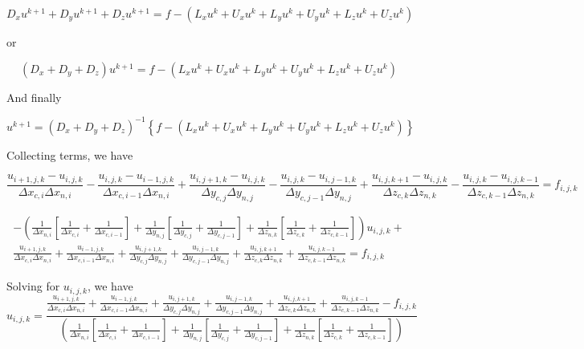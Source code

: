 \documentclass[11pt]{article}
\begin{document}
\begin{equation}
	D_x u^{k+1} +
	D_y u^{k+1} +
	D_z u^{k+1}
	 = f - (
	L_x u^{k} + U_x u^{k} +
	L_y u^{k} + U_y u^{k} +
	L_z u^{k} + U_z u^{k}
	)
\end{equation}

or

\begin{equation}
	(D_x + D_y + D_z) u^{k+1}
	 = f - (
	L_x u^{k} + U_x u^{k} +
	L_y u^{k} + U_y u^{k} +
	L_z u^{k} + U_z u^{k}
	)
\end{equation}

And finally

\begin{equation}
	u^{k+1}
	 = 
	(D_x + D_y + D_z)^{-1}
	\left\{
	f - (
	L_x u^{k} + U_x u^{k} +
	L_y u^{k} + U_y u^{k} +
	L_z u^{k} + U_z u^{k}
	) \right\}
\end{equation}

Collecting terms, we have

\begin{equation}
	\frac{u_{i+1,j,k}-u_{i,j,k}}{\Delta x_{c,i} \Delta x_{n,i}} - \frac{u_{i,j,k}-u_{i-1,j,k}}{\Delta x_{c,i-1} \Delta x_{n,i}} + 
	\frac{u_{i,j+1,k}-u_{i,j,k}}{\Delta y_{c,j} \Delta y_{n,j}} - \frac{u_{i,j,k}-u_{i,j-1,k}}{\Delta y_{c,j-1} \Delta y_{n,j}} +
	\frac{u_{i,j,k+1}-u_{i,j,k}}{\Delta z_{c,k} \Delta z_{n,k}} - \frac{u_{i,j,k}-u_{i,j,k-1}}{\Delta z_{c,k-1} \Delta z_{n,k}} = f_{i,j,k}
\end{equation}


\begin{multline}
	-\left( 
	\frac{ 1 }{ \Delta x_{n,i} }
	\left[
	\frac{ 1 }{ \Delta x_{c,i} } +
	\frac{ 1 }{ \Delta x_{c,i-1} }
	\right] +
	\frac{ 1 }{ \Delta y_{n,j} }
	\left[
	\frac{ 1 }{ \Delta y_{c,j} } +
	\frac{ 1 }{ \Delta y_{c,j-1} }
	\right] +
	\frac{ 1 }{ \Delta z_{n,k} }
	\left[
	\frac{ 1 }{ \Delta z_{c,k} } +
	\frac{ 1 }{ \Delta z_{c,k-1} }
	\right]
	\right) u_{i,j,k}
	+ \\
	\frac{u_{i+1,j,k}}{\Delta x_{c,i} \Delta x_{n,i}} + \frac{u_{i-1,j,k}}{\Delta x_{c,i-1} \Delta x_{n,i}} + 
	\frac{u_{i,j+1,k}}{\Delta y_{c,j} \Delta y_{n,j}} + \frac{u_{i,j-1,k}}{\Delta y_{c,j-1} \Delta y_{n,j}} +
	\frac{u_{i,j,k+1}}{\Delta z_{c,k} \Delta z_{n,k}} + \frac{u_{i,j,k-1}}{\Delta z_{c,k-1} \Delta z_{n,k}} = f_{i,j,k}
\end{multline}

Solving for $u_{i,j,k}$, we have
\begin{equation}
	u_{i,j,k} = 
	\frac{ 
	\frac{u_{i+1,j,k}}{\Delta x_{c,i} \Delta x_{n,i}} + \frac{u_{i-1,j,k}}{\Delta x_{c,i-1} \Delta x_{n,i}} + 
	\frac{u_{i,j+1,k}}{\Delta y_{c,j} \Delta y_{n,j}} + \frac{u_{i,j-1,k}}{\Delta y_{c,j-1} \Delta y_{n,j}} +
	\frac{u_{i,j,k+1}}{\Delta z_{c,k} \Delta z_{n,k}} + \frac{u_{i,j,k-1}}{\Delta z_{c,k-1} \Delta z_{n,k}}
	- f_{i,j,k} }{
	\left( 
	\frac{ 1 }{ \Delta x_{n,i} }
	\left[
	\frac{ 1 }{ \Delta x_{c,i} } +
	\frac{ 1 }{ \Delta x_{c,i-1} }
	\right] +
	\frac{ 1 }{ \Delta y_{n,j} }
	\left[
	\frac{ 1 }{ \Delta y_{c,j} } +
	\frac{ 1 }{ \Delta y_{c,j-1} }
	\right] +
	\frac{ 1 }{ \Delta z_{n,k} }
	\left[
	\frac{ 1 }{ \Delta z_{c,k} } +
	\frac{ 1 }{ \Delta z_{c,k-1} }
	\right]
	\right)
	}
\end{equation}
\end{document}
